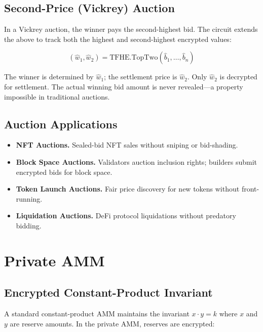 \documentclass[11pt,letterpaper]{article}
\theoremstyle{definition}
\theoremstyle{remark}
\begin{document}
\subsection{Second-Price (Vickrey) Auction}

In a Vickrey auction, the winner pays the second-highest bid. The circuit extends the above to track both the highest and second-highest encrypted values:

\begin{equation}
(\hat{w}_1, \hat{w}_2) = \text{TFHE.TopTwo}(\hat{b}_1, \ldots, \hat{b}_n)
\end{equation}

The winner is determined by $\hat{w}_1$; the settlement price is $\hat{w}_2$. Only $\hat{w}_2$ is decrypted for settlement. The actual winning bid amount is never revealed---a property impossible in traditional auctions.

\subsection{Auction Applications}

\begin{itemize}
    \item \textbf{NFT Auctions.} Sealed-bid NFT sales without sniping or bid-shading.
    \item \textbf{Block Space Auctions.} Validators auction inclusion rights; builders submit encrypted bids for block space.
    \item \textbf{Token Launch Auctions.} Fair price discovery for new tokens without front-running.
    \item \textbf{Liquidation Auctions.} DeFi protocol liquidations without predatory bidding.
\end{itemize}

\section{Private AMM}
\label{sec:amm}

\subsection{Encrypted Constant-Product Invariant}

A standard constant-product AMM maintains the invariant $x \cdot y = k$ where $x$ and $y$ are reserve amounts. In the private AMM, reserves are encrypted:
\end{document}
